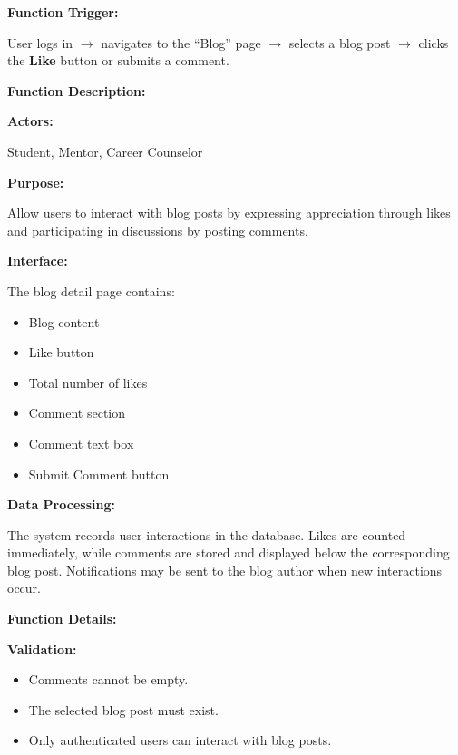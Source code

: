 \textbf{Function Trigger:}

User logs in $\rightarrow$ navigates to the ``Blog'' page $\rightarrow$ selects a blog post $\rightarrow$ clicks the \textbf{Like} button or submits a comment.

\vspace{0.3cm}

\textbf{Function Description:}

\textbf{Actors:}

Student, Mentor, Career Counselor

\vspace{0.2cm}

\textbf{Purpose:}

Allow users to interact with blog posts by expressing appreciation through likes and participating in discussions by posting comments.

\vspace{0.2cm}

\textbf{Interface:}

The blog detail page contains:

\begin{itemize}
    \item Blog content
    \item Like button
    \item Total number of likes
    \item Comment section
    \item Comment text box
    \item Submit Comment button
\end{itemize}

\vspace{0.2cm}

\textbf{Data Processing:}

The system records user interactions in the database. Likes are counted immediately, while comments are stored and displayed below the corresponding blog post. Notifications may be sent to the blog author when new interactions occur.

\vspace{0.3cm}

\textbf{Function Details:}

\textbf{Validation:}

\begin{itemize}
    \item Comments cannot be empty.
    \item The selected blog post must exist.
    \item Only authenticated users can interact with blog posts.
\end{itemize}

